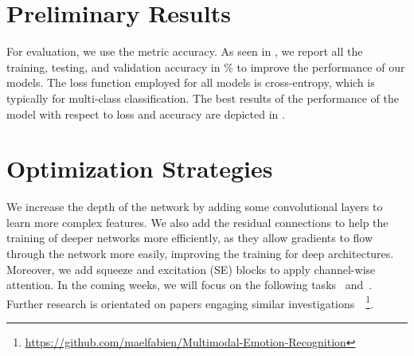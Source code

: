
\section{Preliminary Results}
\label{sec:result}

For evaluation, we use the metric accuracy. 
As seen in , 
we report all the training, testing, and validation accuracy in \% to improve the performance of our models. 
The loss function employed for all models is cross-entropy, which is typically for multi-class classification. 
The best results of the performance of the model with respect to loss and accuracy are depicted in .

\begin{table}
  \centering
  \caption{Accuracy (\%) for different models in our experiments}
  \label{tab:model}
\end{table}

\section{Optimization Strategies}
\label{sec:optim}
We increase the depth of the network by adding some convolutional layers to learn more complex features. 
We also add the residual connections to help the training of deeper networks more efficiently, 
as they allow gradients to flow through the network more easily, improving the training for deep architectures. 
Moreover, 
we add squeeze and excitation (SE) blocks to apply channel-wise attention. 
In the coming weeks, 
we will focus on the following tasks~ and~.
Further research is orientated on papers engaging similar investigations~\cite{ZeilerF14,li_reliable_2017,VermaMRMV23}~\footnote{\url{https://github.com/maelfabien/Multimodal-Emotion-Recognition}}. 

